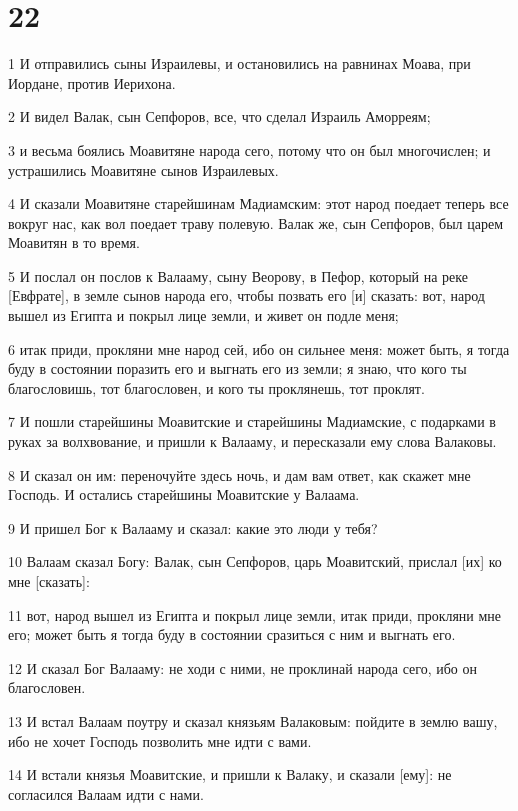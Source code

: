 \chapter{22}

\par 1 И отправились сыны Израилевы, и остановились на равнинах Моава, при Иордане, против Иерихона.
\par 2 И видел Валак, сын Сепфоров, все, что сделал Израиль Аморреям;
\par 3 и весьма боялись Моавитяне народа сего, потому что он был многочислен; и устрашились Моавитяне сынов Израилевых.
\par 4 И сказали Моавитяне старейшинам Мадиамским: этот народ поедает теперь все вокруг нас, как вол поедает траву полевую. Валак же, сын Сепфоров, был царем Моавитян в то время.
\par 5 И послал он послов к Валааму, сыну Веорову, в Пефор, который на реке [Евфрате], в земле сынов народа его, чтобы позвать его [и] сказать: вот, народ вышел из Египта и покрыл лице земли, и живет он подле меня;
\par 6 итак приди, прокляни мне народ сей, ибо он сильнее меня: может быть, я тогда буду в состоянии поразить его и выгнать его из земли; я знаю, что кого ты благословишь, тот благословен, и кого ты проклянешь, тот проклят.
\par 7 И пошли старейшины Моавитские и старейшины Мадиамские, с подарками в руках за волхвование, и пришли к Валааму, и пересказали ему слова Валаковы.
\par 8 И сказал он им: переночуйте здесь ночь, и дам вам ответ, как скажет мне Господь. И остались старейшины Моавитские у Валаама.
\par 9 И пришел Бог к Валааму и сказал: какие это люди у тебя?
\par 10 Валаам сказал Богу: Валак, сын Сепфоров, царь Моавитский, прислал [их] ко мне [сказать]:
\par 11 вот, народ вышел из Египта и покрыл лице земли, итак приди, прокляни мне его; может быть я тогда буду в состоянии сразиться с ним и выгнать его.
\par 12 И сказал Бог Валааму: не ходи с ними, не проклинай народа сего, ибо он благословен.
\par 13 И встал Валаам поутру и сказал князьям Валаковым: пойдите в землю вашу, ибо не хочет Господь позволить мне идти с вами.
\par 14 И встали князья Моавитские, и пришли к Валаку, и сказали [ему]: не согласился Валаам идти с нами.
